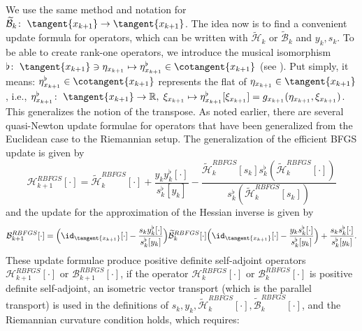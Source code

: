 We use the same method and notation for $\widetilde{\mathcal{B}}_k \colon \; \tangent{x_{k+1}} \to \tangent{x_{k+1}}$. The idea now is to find a convenient update formula for operators, which can be written with $\widetilde{\mathcal{H}}_k$ or $\widetilde{\mathcal{B}}_k$ and $y_k,s_k$. To be able to create rank-one operators, we introduce the musical isomorphism $\flat \colon \; \tangent{x_{k+1}} \ni \eta_{x_{k+1}} \mapsto \eta^{\flat}_{x_{k+1}} \in \cotangent{x_{k+1}}$ (see \cite[p.~6]{BergmannHerzogLouzeiroSilvaTenbrinckVidalNunez:2020:1}). Put simply, it means: $\eta^{\flat}_{x_{k+1}} \in \cotangent{x_{k+1}}$ represents the flat of $\eta_{x_{k+1}} \in \tangent{x_{k+1}}$, i.e., $\eta^{\flat}_{x_{k+1}} \colon \; \tangent{x_{k+1}} \to \mathbb{R}, \;  \xi_{x_{k+1}} \mapsto \eta^{\flat}_{x_{k+1}}[\xi_{x_{k+1}}] = g_{x_{k+1}} (\eta_{x_{k+1}}, \xi_{x_{k+1}})$. This generalizes the notion of the transpose. As noted earlier, there are several quasi-Newton update formulae for operators that have been generalized from the Euclidean case to the Riemannian setup. The generalization of the efficient BFGS update is given by
\begin{equation}\label{directRiemannianBFGSFormula}
    \mathcal{H}^{RBFGS}_{k+1} [\cdot] = \widetilde{\mathcal{H}}^{RBFGS}_k [\cdot] + \frac{y_k y^{\flat}_k[\cdot]}{s^{\flat}_k [y_k]} - \frac{\widetilde{\mathcal{H}}^{RBFGS}_k [s_k] s^{\flat}_k (\widetilde{\mathcal{H}}^{RBFGS}_k [\cdot])}{s^{\flat}_k (\widetilde{\mathcal{H}}^{RBFGS}_k [s_k])}
\end{equation}
and the update for the approximation of the Hessian inverse is given by
\begin{equation}\label{RiemannianInverseBFGSFormula}
        \mathcal{B}^{RBFGS}_{k+1} [\cdot] = \Big{(} \id_{\tangent{x_{k+1}}}[\cdot] - \frac{s_k y^{\flat}_k [\cdot]}{s^{\flat}_k [y_k]} \Big{)} \widetilde{\mathcal{B}}^{RBFGS}_k [\cdot] \Big{(} \id_{\tangent{x_{k+1}}}[\cdot] - \frac{y_k s^{\flat}_k [\cdot]}{s^{\flat}_k [y_k]} \Big{)} + \frac{s_k s^{\flat}_k [\cdot]}{s^{\flat}_k [y_k]}.
\end{equation}
These update formulae produce positive definite self-adjoint operators $\mathcal{H}^{RBFGS}_{k+1} [\cdot]$ or $\mathcal{B}^{RBFGS}_{k+1} [\cdot]$, if the operator $\mathcal{H}^{RBFGS}_k [\cdot]$ or $\mathcal{B}^{RBFGS}_k [\cdot]$ is positive definite self-adjoint, an isometric vector transport (which is the parallel transport) is used in the definitions of $s_k, y_k, \widetilde{\mathcal{H}}^{RBFGS}_k [\cdot], \widetilde{\mathcal{B}}^{RBFGS}_k [\cdot]$, and the Riemannian curvature condition holds, which requires:
